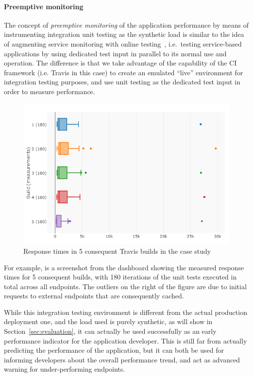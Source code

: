 \documentclass{sig-alternate-05-2015}
\begin{document}
  \paragraph{Preemptive monitoring}
  
  
  The concept of {\em preemptive monitoring} of the application performance by means of instrumenting integration unit testing as the synthetic load is similar to the idea of augmenting service monitoring with online testing~\cite{metzger2010proactive}, i.e.~testing service-based applications by using dedicated test input in parallel to its normal use and operation. The difference is that we take advantage of the capability of the CI framework (i.e. Travis in this case) to create an emulated ``live'' environment for integration testing purposes, and use unit testing as the dedicated test input in order to measure performance. 
  
  \begin{figure}
  	\centering
  	\includegraphics[width=.9\columnwidth]{travis_builds}
  	\caption{Response times in 5 consequent Travis builds in the \zee case study}
  	\label{fig:builds}
  \end{figure}
  
  
  For example,  is a screenshot from the dashboard showing the measured response times for 5 consequent builds, with 180 iterations of the unit tests executed in total across all endpoints. The outliers on the right of the figure are due to initial requests to external endpoints that are consequently cached.  
  
  While this integration testing environment is different from the actual production deployment one, and the load used is purely synthetic, as will show in Section~\ref{sec:evaluation}, it can actually be used successfully as an early performance indicator for the application developer. This is still far from actually predicting the performance of the application, but it can both be used for informing developers about the overall performance trend, and act as advanced warning for under-performing endpoints.  
  
\end{document}
